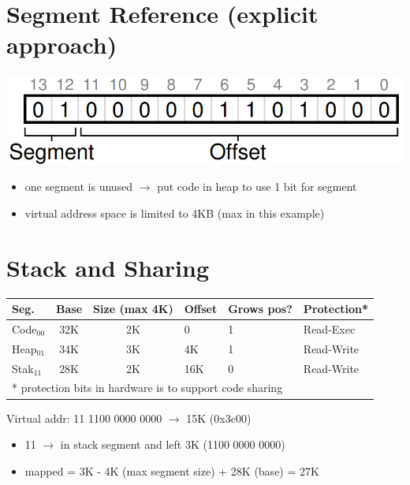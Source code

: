 \section*{Segment Reference (explicit approach)}
\includegraphics[width=\linewidth]{imgs/explicit2}
\begin{itemize}
\item one segment is unused $\to$ put code in heap to use 1 bit for segment
\item virtual address space is limited to 4KB (max in this example)
\end{itemize}
\section*{Stack and Sharing}
\begin{tabular}[th!]{lcclll}
  Seg. & Base & Size (max 4K) & Offset & Grows pos? & Protection*\\
  \hline
  Code$_{00}$ & 32K  & 2K   & 0    & 1 & Read-Exec  \\
  Heap$_{01}$ & 34K  & 3K   & 4K   & 1 & Read-Write \\
  Stak$_{11}$ & 28K  & 2K   & 16K  & 0 & Read-Write \\
  \hline
  \multicolumn{6}{l}{* protection bits in hardware is to support code sharing} \\
  \hline
\end{tabular}
Virtual addr: 11 1100 0000 0000 $\to$ 15K (0x3c00)
\begin{itemize}
\item 11 $\to$ in stack segment and left 3K (1100 0000 0000)
\item mapped = 3K - 4K (max segment size) + 28K (base) = 27K
\end{itemize}
